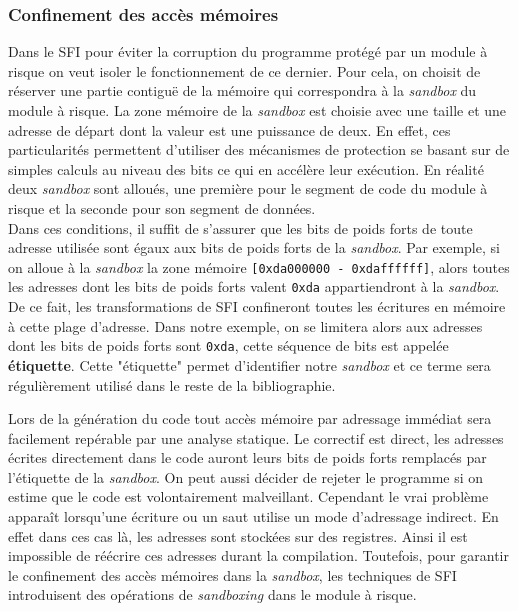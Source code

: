 \documentclass[11pt]{sdm}
\begin{document}
\subsubsection{Confinement des accès mémoires}
Dans le SFI pour éviter la corruption du programme protégé par un module à risque on veut isoler le fonctionnement de ce dernier. Pour cela, on choisit de réserver une partie contiguë de la mémoire qui correspondra à la \textit{sandbox} du module à risque. La zone mémoire de la \textit{sandbox} est choisie avec une taille et une adresse de départ dont la valeur est une puissance de deux. En effet, ces particularités permettent d'utiliser des mécanismes de protection se basant sur de simples calculs au niveau des bits ce qui en accélère leur exécution. En réalité deux \textit{sandbox} sont alloués, une première pour le segment de code du module à risque et la seconde pour son segment de données.
\\
Dans ces conditions, il suffit de s'assurer que les bits de poids forts de toute adresse utilisée sont égaux aux bits de poids forts de la \textit{sandbox}. Par exemple, si on alloue à la \textit{sandbox} la zone mémoire \texttt{[0xda000000~-~0xdaffffff]}, alors toutes les adresses dont les bits de poids forts valent \texttt{0xda} appartiendront à la \textit{sandbox}. De ce fait, les transformations de SFI confineront toutes les écritures en mémoire à cette plage d'adresse. Dans notre exemple, on se limitera alors aux adresses dont les bits de poids forts sont \texttt{0xda}, cette séquence de bits est appelée \textbf{étiquette}. Cette "étiquette" permet d'identifier notre \textit{sandbox} et ce terme sera régulièrement utilisé dans le reste de la bibliographie.

Lors de la génération du code tout accès mémoire par adressage immédiat sera facilement repérable par une analyse statique. Le correctif est direct, les adresses écrites directement dans le code auront leurs bits de poids forts remplacés par l'étiquette de la \textit{sandbox}. On peut aussi décider de rejeter le programme si on estime que le code est volontairement malveillant.
Cependant le vrai problème apparaît lorsqu'une écriture ou un saut utilise un mode d'adressage indirect. En effet dans ces cas là, les adresses sont stockées sur des registres. Ainsi il est impossible de  réécrire ces adresses durant la compilation. Toutefois, pour garantir le confinement des accès mémoires dans la \textit{sandbox}, les techniques de SFI introduisent des opérations de \textit{sandboxing} dans le module à risque. 
\end{document}
